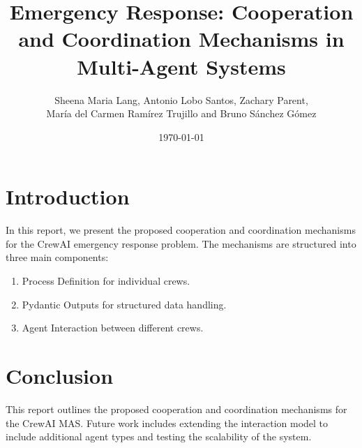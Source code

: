 \documentclass[12pt,a4paper]{article}
\title{Emergency Response: Cooperation and Coordination Mechanisms in Multi-Agent Systems}
\author{Sheena Maria Lang, Antonio Lobo Santos, Zachary Parent, \\ María del Carmen Ramírez Trujillo and Bruno Sánchez Gómez}
\date{\today}
\begin{document}
\maketitle
\tableofcontents
\newpage

\section{Introduction}
In this report, we present the proposed cooperation and coordination mechanisms for the CrewAI emergency response problem. The mechanisms are structured into three main components:
\begin{enumerate}
    \item Process Definition for individual crews.
    \item Pydantic Outputs for structured data handling.
    \item Agent Interaction between different crews.
\end{enumerate}











\section{Conclusion}
This report outlines the proposed cooperation and coordination mechanisms for the CrewAI MAS. Future work includes extending the interaction model to include additional agent types and testing the scalability of the system.
\end{document}

